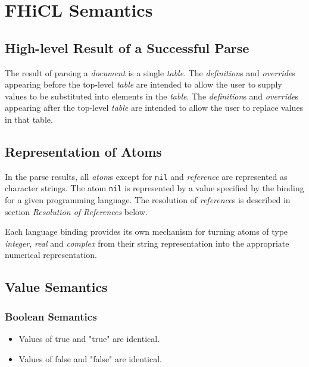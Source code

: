 \documentclass{memarticle}
\begin{document}
\chapter{FHiCL Semantics}{
        \section{High-level Result of a Successful Parse}
                
                The result of parsing a \emph{document}
                is a single \emph{table}.
                The \emph{definition}s and \emph{override}s
                appearing before the top-level \emph{table}
                are intended to allow the user
                to supply values to be substituted into elements in the \emph{table}.
                The \emph{definition}s and \emph{override}s
                appearing after the top-level \emph{table}
                are intended to allow the user
                to replace values in that table.

        \section{Representation of Atoms}
                In the parse results,
                all \emph{atom}s
                except for \texttt{nil} and \emph{reference}
                are represented
                as character strings.
                The atom \texttt{nil} is represented by a 
                value specified by the binding for a given programming language.
                The resolution of \emph{reference}s is described in section \emph{Resolution of References} below.
                \par
                Each language binding
                provides its own mechanism
                for turning atoms of type \emph{integer}, \emph{real} and \emph{complex}
                from their string representation
                into the appropriate numerical representation.
        \section{Value Semantics}
                \subsection{Boolean Semantics}
                        \begin{itemize}
                                \item Values of true and "true" are identical.
                                \item Values of false and "false" are identical.
                        \end{itemize}
}
\end{document}
